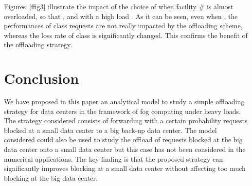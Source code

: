 \documentclass{amsart}
\begin{document}
Figures~\ref{ffig3} illustrate the impact of the choice of  when facility \# is almost overloaded,  so that , and with a high load . As it can be seen, even when , the performances of class  requests are not really impacted by the offloading scheme, whereas the loss rate of class  is significantly changed. This confirms the benefit of the offloading strategy. 

\section{Conclusion}
\label{conclusion}

We have proposed in this paper an analytical model to study a simple offloading strategy for data centers in the framework of fog computing under heavy loads. The strategy considered consists of forwarding with a certain probability requests blocked at a small data center to a big back-up data center. The model considered could also be used to study the offload of requests blocked at the big data center onto a small data center but this case has not been considered in the numerical applications. The key finding is that the proposed strategy can significantly improves blocking at a small data center without affecting too much blocking at the big data center. 
\end{document}
